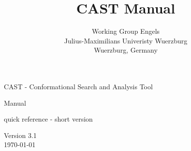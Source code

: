 \documentclass[10pt,a4paper]{article} %
\title{CAST Manual}
\author{Working Group Engels \\
	Julius-Maximilians Univeristy Wuerzburg \\
	Wuerzburg, Germany}
\newif\ifverbose %
\newif\ifdevelopment %
\newif\ifdevmode %
\begin{document}


	CAST - Conformational Search and Analysis Tool

	\ifdevelopment
		Manual for developers and programmers
	\else
		Manual
	\fi

	\ifverbose\else
		quick reference - short version
	\fi

	\ifdevmode
		\colorbox{green}{DEV MODE! THIS MANUAL IS NOT DESTINED TO BE RELEASED!}
	\fi

	Version 3.1 \\
	\today

	\ifdevmode
	\colorbox{red}{WE SHOULD REALLY PUT THE CAST ICON HERE!}
	\fi
	

	\newpage
	\tableofcontents


	\newpage
	\listoffigures

	\newpage
	
\end{document}
